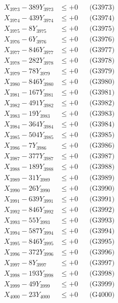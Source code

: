 \documentclass[a4paper,10pt]{article}
\begin{document}
{\begin{align}
X_{3973} - 389Y_{3973} &\leq +0 && \text{(G3973)} \\
X_{3974} - 439Y_{3974} &\leq +0 && \text{(G3974)} \\
X_{3975} - 8Y_{3975} &\leq +0 && \text{(G3975)} \\
X_{3976} - 6Y_{3976} &\leq +0 && \text{(G3976)} \\
X_{3977} - 846Y_{3977} &\leq +0 && \text{(G3977)} \\
X_{3978} - 282Y_{3978} &\leq +0 && \text{(G3978)} \\
X_{3979} - 78Y_{3979} &\leq +0 && \text{(G3979)} \\
X_{3980} - 846Y_{3980} &\leq +0 && \text{(G3980)} \\
\allowbreak
X_{3981} - 167Y_{3981} &\leq +0 && \text{(G3981)} \\
X_{3982} - 491Y_{3982} &\leq +0 && \text{(G3982)} \\
X_{3983} - 19Y_{3983} &\leq +0 && \text{(G3983)} \\
X_{3984} - 364Y_{3984} &\leq +0 && \text{(G3984)} \\
X_{3985} - 504Y_{3985} &\leq +0 && \text{(G3985)} \\
X_{3986} - 7Y_{3986} &\leq +0 && \text{(G3986)} \\
X_{3987} - 377Y_{3987} &\leq +0 && \text{(G3987)} \\
X_{3988} - 189Y_{3988} &\leq +0 && \text{(G3988)} \\
X_{3989} - 31Y_{3989} &\leq +0 && \text{(G3989)} \\
X_{3990} - 26Y_{3990} &\leq +0 && \text{(G3990)} \\
\allowbreak
X_{3991} - 639Y_{3991} &\leq +0 && \text{(G3991)} \\
X_{3992} - 846Y_{3992} &\leq +0 && \text{(G3992)} \\
X_{3993} - 55Y_{3993} &\leq +0 && \text{(G3993)} \\
X_{3994} - 587Y_{3994} &\leq +0 && \text{(G3994)} \\
X_{3995} - 846Y_{3995} &\leq +0 && \text{(G3995)} \\
X_{3996} - 372Y_{3996} &\leq +0 && \text{(G3996)} \\
X_{3997} - 8Y_{3997} &\leq +0 && \text{(G3997)} \\
X_{3998} - 193Y_{3998} &\leq +0 && \text{(G3998)} \\
X_{3999} - 49Y_{3999} &\leq +0 && \text{(G3999)} \\
X_{4000} - 23Y_{4000} &\leq +0 && \text{(G4000)} \\

\end{align}}
\end{document}
